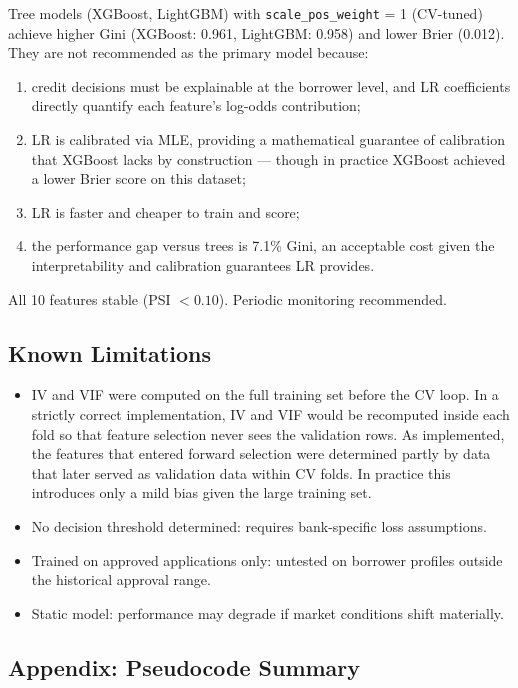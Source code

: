 \documentclass[a4paper,11pt]{article}
\begin{document}
Tree models (XGBoost, LightGBM) with \texttt{scale\_pos\_weight} = 1 (CV-tuned)
achieve higher Gini (XGBoost: 0.961, LightGBM: 0.958) and lower Brier (0.012). They are not recommended as
the primary model because:
\begin{enumerate}[leftmargin=1.5em]
  \item credit decisions must be explainable at the borrower level, and LR
        coefficients directly quantify each feature's log-odds contribution;
  \item LR is calibrated via MLE, providing a mathematical guarantee of calibration
        that XGBoost lacks by construction --- though in practice XGBoost achieved
        a lower Brier score on this dataset;
  \item LR is faster and cheaper to train and score;
  \item the performance gap versus trees is 7.1\% Gini, an acceptable cost given
        the interpretability and calibration guarantees LR provides.
\end{enumerate}

All 10 features stable (PSI $< 0.10$). Periodic monitoring recommended.

\subsection*{Known Limitations}

\begin{itemize}[leftmargin=1.5em]
  \item IV and VIF were computed on the full training set before the CV loop. In a
        strictly correct implementation, IV and VIF would be recomputed inside each
        fold so that feature selection never sees the validation rows. As implemented,
        the features that entered forward selection were determined partly by data that
        later served as validation data within CV folds. In practice this introduces
        only a mild bias given the large training set.
  \item No decision threshold determined: requires bank-specific loss assumptions.
  \item Trained on approved applications only: untested on borrower profiles outside
        the historical approval range.
  \item Static model: performance may degrade if market conditions shift materially.
\end{itemize}

\subsection*{Appendix: Pseudocode Summary}
\end{document}

